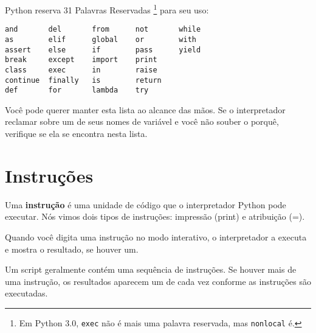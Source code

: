 {{{{{{{{{

Python reserva 31 Palavras Reservadas \footnote{Em Python 3.0, {\tt exec} não é 
mais uma palavra reservada, mas {\tt nonlocal} é.} para seu uso:

\beforeverb
\begin{verbatim}
and       del       from      not       while    
as        elif      global    or        with     
assert    else      if        pass      yield    
break     except    import    print              
class     exec      in        raise              
continue  finally   is        return             
def       for       lambda    try
\end{verbatim}
\afterverb
%

Você pode querer manter esta lista ao alcance das mãos. Se o interpretador reclamar
sobre um de seus nomes de variável e você não souber o porquê, verifique se ela
se encontra nesta lista.

\section{Instruções}

Uma {\bf instrução} é uma unidade de código que o interpretador Python 
pode executar. Nós vimos dois tipos de instruções: impressão (print) 
e atribuição (=).


Quando você digita uma instrução no modo interativo, o interpretador 
a executa e mostra o resultado, se houver um.

Um script geralmente contém uma sequência de instruções. Se houver 
mais de uma instrução, os resultados aparecem um de cada vez 
conforme as instruções são executadas.

}}}}}}}}}
